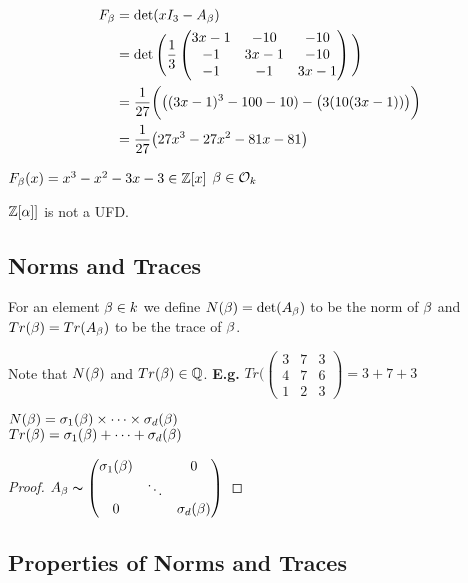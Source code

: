 \documentclass[11pt]{article}
\begin{document}
\begin{align*}
	F_\beta &= \det(xI_3 - A_\beta)\\
	& = \det\Bigg(\frac{1}{3}
	\begin{pmatrix}
		3x-1 & -10 & -10\\
		-1 & 3x-1 & -10\\
		-1 & -1 & 3x-1
	\end{pmatrix}
	\Bigg)\\
	&=\frac{1}{27} \bigg( \big( (3x-1)^3 -100-10) - \big(3(10(3x-1))\big) \bigg) \\
	& = \frac{1}{27} \big(27x^3 - 27x^2 -81x-81 \big)
\end{align*}

$F_\beta(x) = x^3 -x^2 -3x-3 \in \mathbb{Z}[x] $ \hspace{7pt} $\beta \in \mathcal{O}_k$
\spa

$\mathbb{Z}[\alpha]]$ is not a UFD.



\subsection{Norms and Traces}

\begin{defn}
	For an element $\beta \in k $ we define $N(\beta) = \det(A_\beta)$ to be the norm of $\beta$ and $Tr(\beta) = Tr(A_\beta)$ to be the trace of $\beta$.
\end{defn}

Note that $N(\beta)$ and $Tr(\beta) \in \mathbb{Q}$.
\spac 
\textbf{E.g.} $Tr(\begin{pmatrix}
	3 & 7 & 3\\
	4 & 7 & 6\\
	1 & 2 & 3
\end{pmatrix} = 3 + 7+ 3$

\begin{prop}
	$N(\beta) = \sigma_1(\beta) \times \dots \times \sigma_d(\beta)$\\
	$Tr(\beta) = \sigma_1(\beta) + \dots + \sigma_d(\beta)$ 
\end{prop}
\begin{proof}
	$A_\beta \thicksim \begin{pmatrix}
		\sigma_1(\beta) & & 0\\
		&\ddots &\\
		0 && \sigma_d(\beta)
	\end{pmatrix}$
\end{proof}

\subsection{Properties of Norms and Traces}
\end{document}

